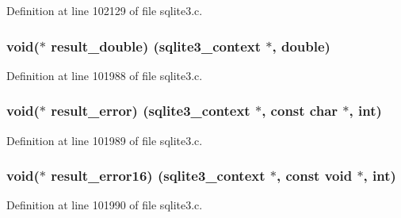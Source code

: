 Definition at line 102129 of file sqlite3.\+c.

\hypertarget{structsqlite3__api__routines_a172b6861ee637d431052ec5dc165477a}{}
\subsubsection[{result\+\_\+double}]{\setlength{\rightskip}{0pt plus 5cm}void($\ast$ result\+\_\+double) ({\bf sqlite3\+\_\+context} $\ast$, double)}\label{structsqlite3__api__routines_a172b6861ee637d431052ec5dc165477a}


Definition at line 101988 of file sqlite3.\+c.

\hypertarget{structsqlite3__api__routines_aa1417502f22656ef502d34c01a9d9731}{}
\subsubsection[{result\+\_\+error}]{\setlength{\rightskip}{0pt plus 5cm}void($\ast$ result\+\_\+error) ({\bf sqlite3\+\_\+context} $\ast$, const char $\ast$, int)}\label{structsqlite3__api__routines_aa1417502f22656ef502d34c01a9d9731}


Definition at line 101989 of file sqlite3.\+c.

\hypertarget{structsqlite3__api__routines_a3e8b406b1d8634148f895a2e47d7098b}{}
\subsubsection[{result\+\_\+error16}]{\setlength{\rightskip}{0pt plus 5cm}void($\ast$ result\+\_\+error16) ({\bf sqlite3\+\_\+context} $\ast$, const void $\ast$, int)}\label{structsqlite3__api__routines_a3e8b406b1d8634148f895a2e47d7098b}


Definition at line 101990 of file sqlite3.\+c.

\hypertarget{structsqlite3__api__routines_a3b70121ec78ad5f66bf83ecb90aba6b5}{}
